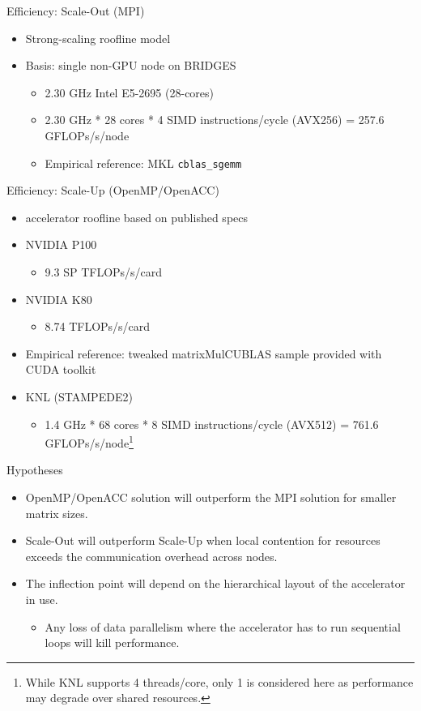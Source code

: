 \documentclass{beamer}
\begin{document}
\begin{frame}{Efficiency: Scale-Out (MPI)}
  \begin{itemize}
  \item{Strong-scaling roofline model}
  \item{Basis: single non-GPU node on BRIDGES}
    \begin{itemize}
    \item{2.30 GHz Intel E5-2695 (28-cores)}
    \item{2.30 GHz * 28 cores * 4 SIMD instructions/cycle (AVX256) = 257.6 GFLOPs/s/node}
    \item{Empirical reference: MKL \texttt{cblas\_sgemm}}
    \end{itemize}
  \end{itemize}
\end{frame}
\begin{frame}{Efficiency: Scale-Up (OpenMP/OpenACC)}
  \begin{itemize}
  \item{accelerator roofline based on published specs}
  \item{NVIDIA P100}
    \begin{itemize}
      \item{9.3 SP TFLOPs/s/card\autocite{P100Datasheet}}
    \end{itemize}
  \item{NVIDIA K80}
    \begin{itemize}
      \item{8.74 TFLOPs/s/card\autocite{AnandtechK80}}
    \end{itemize}
  \item{Empirical reference: tweaked matrixMulCUBLAS sample provided with CUDA toolkit}
  \item{KNL (STAMPEDE2)}
    \begin{itemize}
      \item{1.4 GHz * 68 cores * 8 SIMD instructions/cycle (AVX512) = 761.6 GFLOPs/s/node\autocite{Stampede2UserGuide}\footnote{While KNL supports 4 threads/core, only 1 is considered here as performance may degrade over shared resources.}}
    \end{itemize}
  \end{itemize}
\end{frame}
\begin{frame}{Hypotheses}
  \begin{itemize}
  \item{OpenMP/OpenACC solution will outperform the MPI solution for smaller matrix sizes.}
  \item{Scale-Out will outperform Scale-Up when local contention for resources exceeds the communication overhead across nodes.}
  \item{The inflection point will depend on the hierarchical layout of the accelerator in use.}
    \begin{itemize}
      \item{Any loss of data parallelism where the accelerator has to run sequential loops will kill performance.}
    \end{itemize}
  \end{itemize}
\end{frame}
\end{document}
